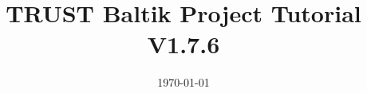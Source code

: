 \documentclass[10pt, hyperref={unicode=true,pdfusetitle, bookmarks=true,bookmarksnumbered=false,bookmarksopen=false, breaklinks=false,pdfborder={0 0 1},backref=true,colorlinks=true,linkcolor=darkblue,pageanchor, urlcolor=darkblue}]{beamer}
\title[TRUST Baltik Project Tutorial V1.7.6]{TRUST Baltik Project Tutorial V1.7.6}
\institute[CEA/DEN/DANS/DM2S/STMF] %
{
CEA Saclay \\ %
\medskip
\textit{triou@cea.fr} %
}
\date{\today} %
\begin{document}
\begin{frame}
\titlepage %
\end{frame}

\begin{frame}
\tableofcontents [hideallsubsections]
\end{frame}
\end{document}
